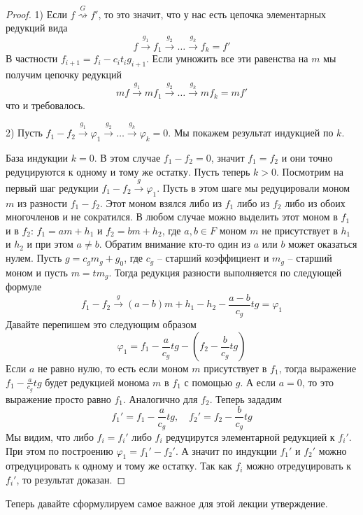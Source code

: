 \begin{proof}
1) Если $f\stackrel{G}{\rightsquigarrow}f'$, то это значит, что у нас есть цепочка элементарных редукций вида
\[
f\stackrel{g_1}{\longrightarrow}f_1 \stackrel{g_2}{\longrightarrow}\ldots  \stackrel{g_k}{\longrightarrow}f_k = f'
\]
В частности $f_{i+1} = f_i - c_i t_i g_{i+1}$.
Если умножить все эти равенства на $m$ мы получим цепочку редукций
\[
mf\stackrel{g_1}{\longrightarrow}mf_1 \stackrel{g_2}{\longrightarrow}\ldots  \stackrel{g_k}{\longrightarrow}mf_k =m f'
\]
что и требовалось.

2) Пусть $f_1 - f_2 \stackrel{g_1}{\longrightarrow}\varphi_1 \stackrel{g_2}{\longrightarrow}\ldots  \stackrel{g_k}{\longrightarrow}\varphi_k = 0$.
Мы покажем результат индукцией по $k$.

База индукции $k = 0$.
В этом случае $f_1 - f_2 = 0$, значит $f_1 = f_2$ и они точно редуцируются к одному и тому же остатку.
Пусть теперь $k > 0$.
Посмотрим на первый шаг редукции $f_1 - f_2 \stackrel{g}{\longrightarrow}\varphi_1$.
Пусть в этом шаге мы редуцировали моном $m$ из разности $f_1 - f_2$.
Этот моном взялся либо из $f_1$ либо из $f_2$ либо из обоих многочленов и не сократился.
В любом случае можно выделить этот моном в $f_1$ и в $f_2$: $f_1 = a m + h_1$ и $f_2 = bm + h_2$, где $a,b\in F$ моном $m$ не присутствует в $h_1$ и $h_2$  и при этом $a \neq b$.
Обратим внимание кто-то один из $a$ или $b$ может оказаться нулем.
Пусть $g = c_g m_g + g_0$, где $c_g$ -- старший коэффициент и $m_g$ -- старший моном и пусть $m = t m_g$.
Тогда редукция разности выполняется по следующей формуле
\[
f_1 - f_2 \stackrel{g}{\longrightarrow}(a-b)m + h_1 -h_2 - \frac{a-b}{c_g}t g = \varphi_1
\]
Давайте перепишем это следующим образом
\[
\varphi_1 = f_1 - \frac{a}{c_g}t g - \left(f_2 - \frac{b}{c_g}t g\right)
\]
Если $a$ не равно нулю, то есть если моном $m$ присутствует в $f_1$, тогда выражение $f_1 - \frac{a}{c_g}t g$ будет редукцией монома $m$ в $f_1$ с помощью $g$.
А если $a = 0$, то это выражение просто равно $f_1$.
Аналогично для $f_2$.
Теперь зададим
\[
f_1'=f_1 - \frac{a}{c_g}tg,\quad f_2'=f_2 - \frac{b}{c_g}tg
\]
Мы видим, что либо $f_i = f_i'$ либо $f_i$ редуцирутся элементарной редукцией к $f_i'$.
При этом по построению $\varphi_1 = f_1' - f_2'$.
А значит по индукции $f_1'$ и $f_2'$ можно отредуцировать к одному и тому же остатку.
Так как $f_i$ можно отредуцировать к $f_i'$, то результат доказан.
\end{proof}

Теперь давайте сформулируем самое важное для этой лекции утверждение.

